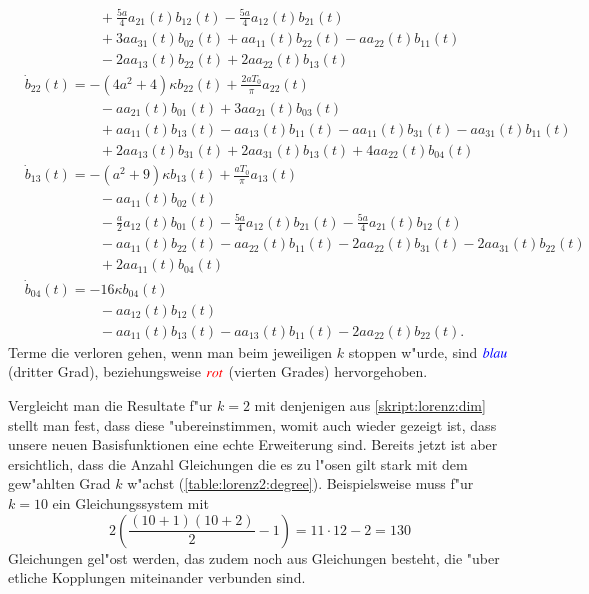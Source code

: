 \begin{refsection}
\begin{align*}
&\phantom{aaaaaaaaaa}
+
\frac{5 a}{4} a_{21}(t) b_{12}(t)
-
\frac{5 a}{4} a_{12}(t) b_{21}(t)
\\
&\phantom{aaaaaaaaaa}
+
3 a
a_{31}(t) b_{02}(t)
+
a
a_{11}(t) b_{22}(t)
-
a
a_{22}(t) b_{11}(t)
\\
&\phantom{aaaaaaaaaa}
-
2 a
a_{13}(t) b_{22}(t)
+
2 a
a_{22}(t) b_{13}(t)
\\
&
\dot{b}_{22}(t)
=
-
(4 a^2+4)
\kappa
b_{22}(t)
+
\frac{2 a T_{0}}{\pi} a_{22}(t)
\\
&\phantom{aaaaaaaaaa}
-
a
a_{21}(t) b_{01}(t)
+
3 a
a_{21}(t) b_{03}(t)
\\
&\phantom{aaaaaaaaaa}
+
a
a_{11}(t) b_{13}(t)
-
a
a_{13}(t) b_{11}(t)
-
a
a_{11}(t) b_{31}(t)
-
a
a_{31}(t) b_{11}(t)
\\
&\phantom{aaaaaaaaaa}
+
2 a
a_{13}(t) b_{31}(t)
+
2 a
a_{31}(t) b_{13}(t)
+
4 a
a_{22}(t) b_{04}(t)
\\
&
\dot{b}_{13}(t)
=
-
(a^2+9)
\kappa
b_{13}(t)
+
\frac{a T_{0}}{\pi} a_{13}(t)
\\
&\phantom{aaaaaaaaaa}
-
a
a_{11}(t) b_{02}(t)
\\
&\phantom{aaaaaaaaaa}
-
\frac{a}{2} a_{12}(t) b_{01}(t)
-
\frac{5 a}{4} a_{12}(t) b_{21}(t)
-
\frac{5 a}{4} a_{21}(t) b_{12}(t)
\\
&\phantom{aaaaaaaaaa}
-
a
a_{11}(t) b_{22}(t)
-
a
a_{22}(t) b_{11}(t)
-
2 a
a_{22}(t) b_{31}(t)
-
2 a
a_{31}(t) b_{22}(t)
\\
&\phantom{aaaaaaaaaa}
+
2 a
a_{11}(t) b_{04}(t)
\\
&
\dot{b}_{04}(t)
=
-
16
\kappa
b_{04}(t)
\\
&\phantom{aaaaaaaaaa}
-
a
a_{12}(t) b_{12}(t)
\\
&\phantom{aaaaaaaaaa}
-
a
a_{11}(t) b_{13}(t)
-
a
a_{13}(t) b_{11}(t)
-
2a
a_{22}(t) b_{22}(t).
\end{align*}
Terme die verloren gehen, wenn man beim jeweiligen $k$ stoppen w"urde, sind 
$\color{blue}{blau}$ (dritter Grad), beziehungsweise $\color{red}{rot}$ 
(vierten Grades) hervorgehoben.

Vergleicht man die Resultate f"ur $k = 2$ mit denjenigen aus 
\cref{skript:lorenz:dim} stellt man fest, dass diese "ubereinstimmen, womit 
auch wieder gezeigt ist, dass unsere neuen Basisfunktionen eine echte 
Erweiterung sind. Bereits jetzt ist aber ersichtlich, dass die Anzahl 
Gleichungen die es zu l"osen gilt stark mit dem gew"ahlten Grad $k$ w"achst 
(\cref{table:lorenz2:degree}). Beispielsweise muss f"ur $k = 10$ ein 
Gleichungssystem mit
\begin{equation*}
	2\left(\frac{(10 + 1)(10 + 2)}{2} - 1\right) = 11 \cdot 12 - 2 = 130
\end{equation*}
Gleichungen gel"ost werden, das zudem noch aus Gleichungen besteht, die "uber 
etliche Kopplungen miteinander verbunden sind.


\end{refsection}
